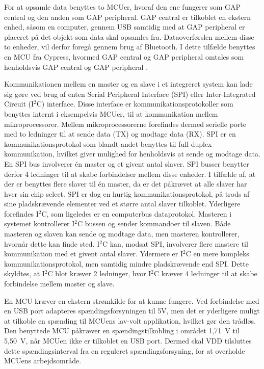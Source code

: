 %
For at opsamle data benyttes to MCUer, hvoraf den ene fungerer som GAP central og den anden som GAP peripheral. GAP central er tilkoblet en ekstern enhed, såsom en computer, gennem USB samtidig med at GAP peripheral er placeret på det objekt som data skal opsamles fra. Dataoverførslen mellem disse to enheder, vil derfor foregå gennem brug af Bluetooth. I dette tilfælde benyttes en MCU fra Cypress, hvormed GAP central og GAP peripheral omtales som henholdsvis GAP central og GAP peripheral \citep{Luthra2015}. \newline

Kommunikationen mellem en master og en slave i et integreret system kan lade sig gøre ved brug af enten Serial Peripheral Interface (SPI) eller Inter-Integrated Circuit (I$^{2}$C) interface. Disse interface er kommunikationsprotokoller som benyttes internt i eksempelvis MCUer, til at kommunikation mellem mikroprocessorer. Mellem mikroprocessorerne forefindes dermed serielle porte med to ledninger til at sende data (TX) og modtage data (RX). \citep{Semiconductor2016} \newline
SPI er en kommunikationsprotokol som blandt andet benyttes til full-duplex kommunikation, hvilket giver mulighed for henholdsvis at sende og modtage data. En SPI bus involverer én master og et givent antal slaver. SPI busser benytter derfor 4 ledninger til at skabe forbindelser mellem disse enheder. I tilfælde af, at der er benyttes flere slaver til én master, da er det påkrævet at alle slaver har hver sin chip select. SPI er dog en hurtig kommunikationsprotokol, på trods af sine pladskrævende elementer ved et større antal slaver tilkoblet. \citep{Semiconductor2016,Sparkfun2016} \newline
Yderligere forefindes I$^{2}$C, som ligeledes er en computerbus dataprotokol. Masteren i systemet kontrollerer I$^{2}$C bussen og sender kommandoer til slaven. Både masteren og slaven kan sende og modtage data, men masteren kontrollerer, hvornår dette kan finde sted. \newline
I$^{2}$C kan, modsat SPI, involverer flere mastere til kommunikation med et givent antal slaver. Ydermere er I$^{2}$C en mere kompleks kommunikationsprotokol, men samtidig mindre pladskrævende end SPI. Dette skyldtes, at I$^{2}$C blot kræver 2 ledninger, hvor I$^{2}$C kræver 4 ledninger til at skabe forbindelse mellem master og slave. \citep{Semiconductor2016,Sparkfun2016}

En MCU kræver en ekstern strømkilde for at kunne fungere. Ved forbindelse med en USB port adapteres spændingsforsyningen til 5V, men det er yderligere muligt at tilkoble en spænding til MCUens lav-volt applikation, hvilket gør den trådløs. \newline
Den benyttede MCU påkræver en spændingstilkobling i området 1,71~V til 5,50~V, når MCUen ikke er tilkoblet en USB port. Dermed skal VDD tilsluttes dette spændingsinterval fra en reguleret spændingsforsyning, for at overholde MCUens arbejdsområde. \citep{Semiconductor2016,Semiconductor20164200M}

